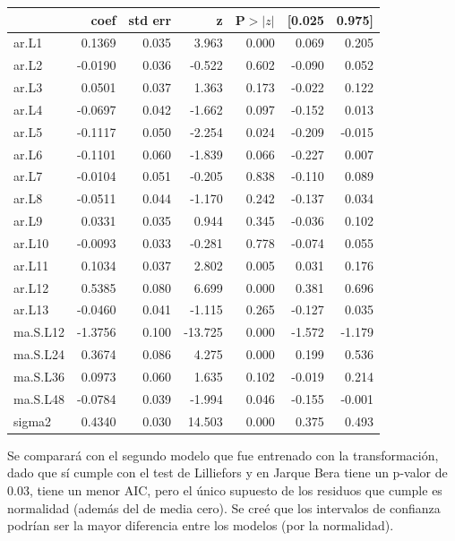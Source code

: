 \documentclass[12pt,letterpaper]{article}   %
\begin{document}
\begin{table}[htbp]
\begin{tabular}{lrrrrrr}
\toprule
 & \textbf{coef} & \textbf{std err} & \textbf{z} & \textbf{P$>|z|$} & \textbf{[0.025} & \textbf{0.975]} \\
\midrule
ar.L1     & 0.1369 & 0.035 & 3.963  & 0.000 & 0.069 & 0.205 \\
ar.L2     & -0.0190 & 0.036 & -0.522 & 0.602 & -0.090 & 0.052 \\
ar.L3     & 0.0501 & 0.037 & 1.363  & 0.173 & -0.022 & 0.122 \\
ar.L4     & -0.0697 & 0.042 & -1.662 & 0.097 & -0.152 & 0.013 \\
ar.L5     & -0.1117 & 0.050 & -2.254 & 0.024 & -0.209 & -0.015 \\
ar.L6     & -0.1101 & 0.060 & -1.839 & 0.066 & -0.227 & 0.007 \\
ar.L7     & -0.0104 & 0.051 & -0.205 & 0.838 & -0.110 & 0.089 \\
ar.L8     & -0.0511 & 0.044 & -1.170 & 0.242 & -0.137 & 0.034 \\
ar.L9     & 0.0331 & 0.035 & 0.944  & 0.345 & -0.036 & 0.102 \\
ar.L10    & -0.0093 & 0.033 & -0.281 & 0.778 & -0.074 & 0.055 \\
ar.L11    & 0.1034 & 0.037 & 2.802  & 0.005 & 0.031 & 0.176 \\
ar.L12    & 0.5385 & 0.080 & 6.699  & 0.000 & 0.381 & 0.696 \\
ar.L13    & -0.0460 & 0.041 & -1.115 & 0.265 & -0.127 & 0.035 \\
ma.S.L12  & -1.3756 & 0.100 & -13.725 & 0.000 & -1.572 & -1.179 \\
ma.S.L24  & 0.3674 & 0.086 & 4.275  & 0.000 & 0.199 & 0.536 \\
ma.S.L36  & 0.0973 & 0.060 & 1.635  & 0.102 & -0.019 & 0.214 \\
ma.S.L48  & -0.0784 & 0.039 & -1.994 & 0.046 & -0.155 & -0.001 \\
sigma2    & 0.4340 & 0.030 & 14.503 & 0.000 & 0.375 & 0.493 \\
\bottomrule
\end{tabular}
\end{table}






Se comparará con el segundo modelo que fue entrenado con la transformación, dado que sí cumple con el test de Lilliefors y en Jarque Bera tiene un p-valor de 0.03, tiene un menor AIC, pero el único supuesto de los residuos que cumple es normalidad (además del de media cero). Se creé que los intervalos de confianza podrían ser la mayor diferencia entre los modelos (por la normalidad).
\end{document}
